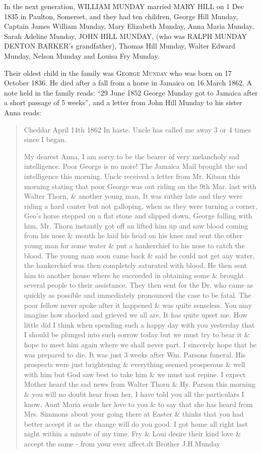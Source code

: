 In the next generation, \uppercase{William Munday} married \uppercase{Mary Hill} on 1 Dec 1835 in	Paulton, Somerset, and they had ten children, George Hill Munday, Captain James William Munday, Mary Elizabeth Munday, Anna Maria Munday, Sarah Adeline Munday, \uppercase{John Hill Munday}, (who was \uppercase{Ralph Munday Denton Barker}'s grandfather), Thomas Hill Munday, Walter Edward Munday, Nelson Munday and Louisa Fry Munday. 

Their oldest child in the family was \textsc{George Munday} who was born on 17 October 1836. He died after a fall from a horse in Jamaica on 16 March 1862. A note held in the family reads: ``29 June 1852 George Munday got to Jamaica after a short passage of 5 weeks'', and a letter from John Hill Munday to his sister Anna reads:

\begin{quotation}
Cheddar April 14th 1862
In haste. Uncle has called me away 3 or 4 times since I began.

My dearest Anna,
   I am sorry to be the bearer of very melancholy sad intelligence. Poor George is no more! The Jamaica Mail brought the sad intelligence this morning. Uncle received a letter from Mr. Kitson this morning stating that poor George was out riding on the 9th Mar. last with Walter Thorn, \& another young man. It was rather late and they were riding a hard canter but not galloping, when as they were turning a corner, Geo's horse stepped on a flat stone and slipped down, George falling with him, Mr. Thorn instantly got off an lifted him up and saw blood coming from his nose \& mouth he laid his head on his knee and sent the other young man for some water \& put a hankerchief to his nose to catch the blood. The young man soon came back \& said he could not get any water, the hankerchief was then completely saturated with blood. He then sent him to another house where he succeeded in obtaining some \& brought several people to their assistance. They then sent for the Dr. who came as quickly as possible and immediately pronounced the case to be fatal.
    The poor fellow never spoke after it happened \& was quite senseless. You may imagine how shocked and grieved we all are. It has quite upset me.
    How little did I think when spending such a happy day with you yesterday that I should be plunged into such sorrow today but we must try to bear it \& hope to meet him again where we shall never part. I sincerely hope that he was prepared to die. It was just 3 weeks after Wm. Parsons funeral. His prospects were just brightening \& everything seemed prosperous \& well with him but God saw best to take him \& we must not repine. I expect Mother heard the sad news from Walter Thorn \& Hy. Parson this morning \& you will no doubt hear from her. I have told you all the particulars I know.
    Aunt Maria sends her love to you \& to say that she has heard from Mrs. Simmons about your going there at Easter \& thinks that you had better accept it as the change will do you good.
    I got home all right last night within a minute of my time.
    Fry \& Loui desire their kind love \& accept the same -
    from your ever affect.dt Brother
    J.H.Munday
    \end{quotation}
    
